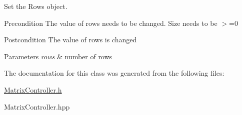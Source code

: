 Set the Rows object. 

\begin{DoxyPrecond}{Precondition}
The value of rows needs to be changed. Size needs to be $>$=0 
\end{DoxyPrecond}
\begin{DoxyPostcond}{Postcondition}
The value of rows is changed 
\end{DoxyPostcond}

\begin{DoxyParams}{Parameters}
{\em rows} & number of rows \\
\hline
\end{DoxyParams}


The documentation for this class was generated from the following files\+:\begin{DoxyCompactItemize}
\item 
\mbox{\hyperlink{_matrix_controller_8h}{Matrix\+Controller.\+h}}\item 
Matrix\+Controller.\+hpp\end{DoxyCompactItemize}
